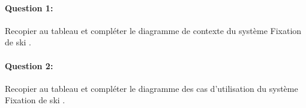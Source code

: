 \paragraph{Question 1:} Recopier au tableau et compléter le diagramme de contexte du système \og Fixation de ski \fg.

\begin{center}
\end{center}

\paragraph{Question 2:} Recopier au tableau et compléter le diagramme des cas d'utilisation du système \og Fixation de ski \fg.

\begin{center}
\end{center}

